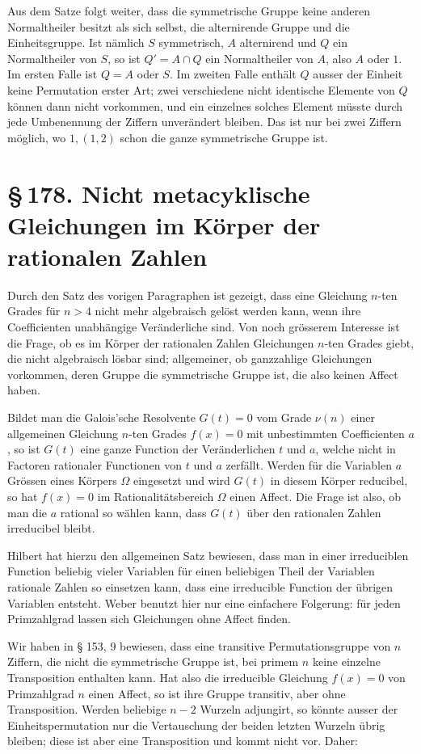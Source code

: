 \documentclass[11pt]{article}
\newcommand{\sect}[2]{\section*{\S\,#1. #2}}
\begin{document}
Aus dem Satze folgt weiter, dass die symmetrische Gruppe keine anderen Normaltheiler besitzt als sich selbst, die alternirende Gruppe und die Einheitsgruppe. Ist nämlich $S$ symmetrisch, $A$ alternirend und $Q$ ein Normaltheiler von $S$, so ist $Q'=A\cap Q$ ein Normaltheiler von $A$, also $A$ oder $1$. Im ersten Falle ist $Q=A$ oder $S$. Im zweiten Falle enthält $Q$ ausser der Einheit keine Permutation erster Art; zwei verschiedene nicht identische Elemente von $Q$ können dann nicht vorkommen, und ein einzelnes solches Element müsste durch jede Umbenennung der Ziffern unverändert bleiben. Das ist nur bei zwei Ziffern möglich, wo $1,(1,2)$ schon die ganze symmetrische Gruppe ist.

\sect{178}{Nicht metacyklische Gleichungen im Körper der rationalen Zahlen}

Durch den Satz des vorigen Paragraphen ist gezeigt, dass eine Gleichung $n$-ten Grades für $n>4$ nicht mehr algebraisch gelöst werden kann, wenn ihre Coefficienten unabhängige Veränderliche sind. Von noch grösserem Interesse ist die Frage, ob es im Körper der rationalen Zahlen Gleichungen $n$-ten Grades giebt, die nicht algebraisch lösbar sind; allgemeiner, ob ganzzahlige Gleichungen vorkommen, deren Gruppe die symmetrische Gruppe ist, die also keinen Affect haben.

Bildet man die Galois'sche Resolvente $G(t)=0$ vom Grade $\nu(n)$ einer allgemeinen Gleichung $n$-ten Grades $f(x)=0$ mit unbestimmten Coefficienten $a$, so ist $G(t)$ eine ganze Function der Veränderlichen $t$ und $a$, welche nicht in Factoren rationaler Functionen von $t$ und $a$ zerfällt. Werden für die Variablen $a$ Grössen eines Körpers $\Omega$ eingesetzt und wird $G(t)$ in diesem Körper reducibel, so hat $f(x)=0$ im Rationalitätsbereich $\Omega$ einen Affect. Die Frage ist also, ob man die $a$ rational so wählen kann, dass $G(t)$ über den rationalen Zahlen irreducibel bleibt.

Hilbert hat hierzu den allgemeinen Satz bewiesen, dass man in einer irreduciblen Function beliebig vieler Variablen für einen beliebigen Theil der Variablen rationale Zahlen so einsetzen kann, dass eine irreducible Function der übrigen Variablen entsteht. Weber benutzt hier nur eine einfachere Folgerung: für jeden Primzahlgrad lassen sich Gleichungen ohne Affect finden.

Wir haben in § 153, 9 bewiesen, dass eine transitive Permutationsgruppe von $n$ Ziffern, die nicht die symmetrische Gruppe ist, bei primem $n$ keine einzelne Transposition enthalten kann. Hat also die irreducible Gleichung $f(x)=0$ von Primzahlgrad $n$ einen Affect, so ist ihre Gruppe transitiv, aber ohne Transposition. Werden beliebige $n-2$ Wurzeln adjungirt, so könnte ausser der Einheitspermutation nur die Vertauschung der beiden letzten Wurzeln übrig bleiben; diese ist aber eine Transposition und kommt nicht vor. Daher:
\end{document}
